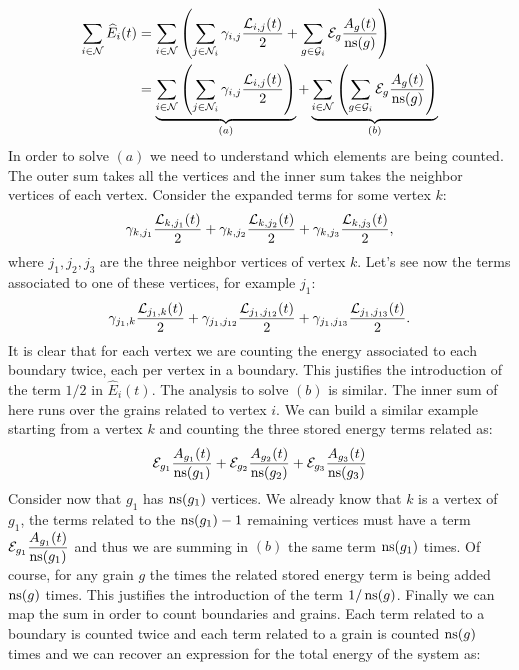 \begin{align*}
     \sum_{i \in \mathcal{N}}\widehat{E}_i(t) &=
     \sum_{i \in \mathcal{N}}\left(
     \sum_{j \in \mathcal{N}_i}\gamma_{i,j}\dfrac{\mathcal{L}_{i,j}(t)}{2} + \sum_{g \in \mathcal{G}_i} \mathcal{E}_{g}\dfrac{A_{g}(t)}{\operatorname{ns}(g)}\right) \\
     &=
     \underbrace{\sum_{i \in \mathcal{N}}\left(
     \sum_{j \in \mathcal{N}_i}\gamma_{i,j}\dfrac{\mathcal{L}_{i,j}(t)}{2}\right)}_{(a)}  + 
     \underbrace{\sum_{i \in \mathcal{N}}\left(\sum_{g \in \mathcal{G}_i} \mathcal{E}_{g}\dfrac{A_{g}(t)}{\operatorname{ns}(g)}\right)}_{(b)}
 \end{align*}
In order to solve $(a)$ we need to understand which elements are being counted. The outer sum takes all the vertices and the inner sum takes the neighbor vertices of each vertex. Consider the expanded terms for some vertex $k$:
\begin{equation*} \gamma_{k,j_1} \frac{\mathcal{L}_{k,j_1}(t)}{2} + 
\gamma_{k,j_2} \frac{\mathcal{L}_{k,j_2}(t)}{2} +
\gamma_{k,j_3} \frac{\mathcal{L}_{k,j_3}(t)}{2},
\end{equation*}
where $j_1, j_2, j_3$ are the three neighbor vertices of vertex $k$. Let's see now the terms associated to one of these vertices, for example $j_1$:
\begin{equation*} \gamma_{j_1,k} \frac{\mathcal{L}_{j_1,k}(t)}{2} + 
\gamma_{j_1,j_{12}} \frac{\mathcal{L}_{j_1,j_{12}}(t)}{2} +
\gamma_{j_1,j_{13}} \frac{\mathcal{L}_{j_1,j_{13}}(t)}{2}.
\end{equation*}
It is clear that for each vertex we are counting the energy associated to each boundary twice, each per vertex in a boundary. This justifies the introduction of the term $1/2$ in $\widehat{E}_i(t)$. The analysis to solve $(b)$ is similar. The inner sum of here runs over the grains related to vertex $i$. We can build a similar example starting from a vertex $k$ and counting the three stored energy terms related as:
\begin{equation*}
    \mathcal{E}_{g_1} \frac{A_{g_1}(t)}{\operatorname{ns}(g_1)}+
    \mathcal{E}_{g_2} \frac{A_{g_2}(t)}{\operatorname{ns}(g_2)}+
    \mathcal{E}_{g_3} \frac{A_{g_3}(t)}{\operatorname{ns}(g_3)}
\end{equation*}
Consider now that $g_1$ has $\operatorname{ns}(g_1)$ vertices. We already know that $k$ is a vertex of $g_1$, the terms related to the $\operatorname{ns}(g_1) -1 $ remaining vertices must have a term $\mathcal{E}_{g_1} \dfrac{A_{g_1}(t)}{\operatorname{ns}(g_1)}$ and thus we are summing in $(b)$ the same term $\operatorname{ns}(g_1)$ times. Of course, for any grain $g$ the times the related stored energy term is being added $\operatorname{ns}(g)$ times. This justifies the introduction of the term $1/\operatorname{ns}(g)$. Finally we can map the sum in order to count boundaries and grains. Each term related to a boundary is counted twice and each term related to a grain is counted $\operatorname{ns}(g)$ times and we can recover an expression for the total energy of the system as:

